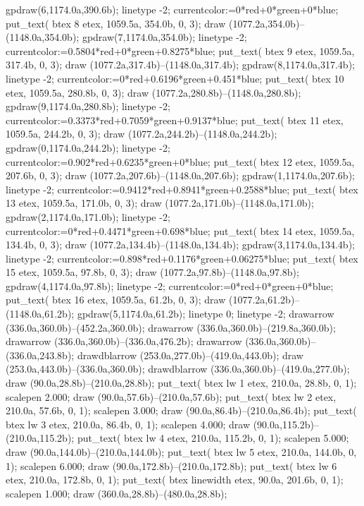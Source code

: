 gpdraw(6,1174.0a,390.6b);
linetype -2;
currentcolor:=0*red+0*green+0*blue;
put_text( btex 8 etex, 1059.5a, 354.0b, 0, 3);
draw (1077.2a,354.0b)--(1148.0a,354.0b);
gpdraw(7,1174.0a,354.0b);
linetype -2;
currentcolor:=0.5804*red+0*green+0.8275*blue;
put_text( btex 9 etex, 1059.5a, 317.4b, 0, 3);
draw (1077.2a,317.4b)--(1148.0a,317.4b);
gpdraw(8,1174.0a,317.4b);
linetype -2;
currentcolor:=0*red+0.6196*green+0.451*blue;
put_text( btex 10 etex, 1059.5a, 280.8b, 0, 3);
draw (1077.2a,280.8b)--(1148.0a,280.8b);
gpdraw(9,1174.0a,280.8b);
linetype -2;
currentcolor:=0.3373*red+0.7059*green+0.9137*blue;
put_text( btex 11 etex, 1059.5a, 244.2b, 0, 3);
draw (1077.2a,244.2b)--(1148.0a,244.2b);
gpdraw(0,1174.0a,244.2b);
linetype -2;
currentcolor:=0.902*red+0.6235*green+0*blue;
put_text( btex 12 etex, 1059.5a, 207.6b, 0, 3);
draw (1077.2a,207.6b)--(1148.0a,207.6b);
gpdraw(1,1174.0a,207.6b);
linetype -2;
currentcolor:=0.9412*red+0.8941*green+0.2588*blue;
put_text( btex 13 etex, 1059.5a, 171.0b, 0, 3);
draw (1077.2a,171.0b)--(1148.0a,171.0b);
gpdraw(2,1174.0a,171.0b);
linetype -2;
currentcolor:=0*red+0.4471*green+0.698*blue;
put_text( btex 14 etex, 1059.5a, 134.4b, 0, 3);
draw (1077.2a,134.4b)--(1148.0a,134.4b);
gpdraw(3,1174.0a,134.4b);
linetype -2;
currentcolor:=0.898*red+0.1176*green+0.06275*blue;
put_text( btex 15 etex, 1059.5a, 97.8b, 0, 3);
draw (1077.2a,97.8b)--(1148.0a,97.8b);
gpdraw(4,1174.0a,97.8b);
linetype -2;
currentcolor:=0*red+0*green+0*blue;
put_text( btex 16 etex, 1059.5a, 61.2b, 0, 3);
draw (1077.2a,61.2b)--(1148.0a,61.2b);
gpdraw(5,1174.0a,61.2b);
linetype 0;
linetype -2;
drawarrow (336.0a,360.0b)--(452.2a,360.0b);
drawarrow (336.0a,360.0b)--(219.8a,360.0b);
drawarrow (336.0a,360.0b)--(336.0a,476.2b);
drawarrow (336.0a,360.0b)--(336.0a,243.8b);
drawdblarrow (253.0a,277.0b)--(419.0a,443.0b);
draw (253.0a,443.0b)--(336.0a,360.0b);
drawdblarrow (336.0a,360.0b)--(419.0a,277.0b);
draw (90.0a,28.8b)--(210.0a,28.8b);
put_text( btex   lw 1 etex, 210.0a, 28.8b, 0, 1);
scalepen 2.000;
draw (90.0a,57.6b)--(210.0a,57.6b);
put_text( btex   lw 2 etex, 210.0a, 57.6b, 0, 1);
scalepen 3.000;
draw (90.0a,86.4b)--(210.0a,86.4b);
put_text( btex   lw 3 etex, 210.0a, 86.4b, 0, 1);
scalepen 4.000;
draw (90.0a,115.2b)--(210.0a,115.2b);
put_text( btex   lw 4 etex, 210.0a, 115.2b, 0, 1);
scalepen 5.000;
draw (90.0a,144.0b)--(210.0a,144.0b);
put_text( btex   lw 5 etex, 210.0a, 144.0b, 0, 1);
scalepen 6.000;
draw (90.0a,172.8b)--(210.0a,172.8b);
put_text( btex   lw 6 etex, 210.0a, 172.8b, 0, 1);
put_text( btex linewidth etex, 90.0a, 201.6b, 0, 1);
scalepen 1.000;
draw (360.0a,28.8b)--(480.0a,28.8b);
